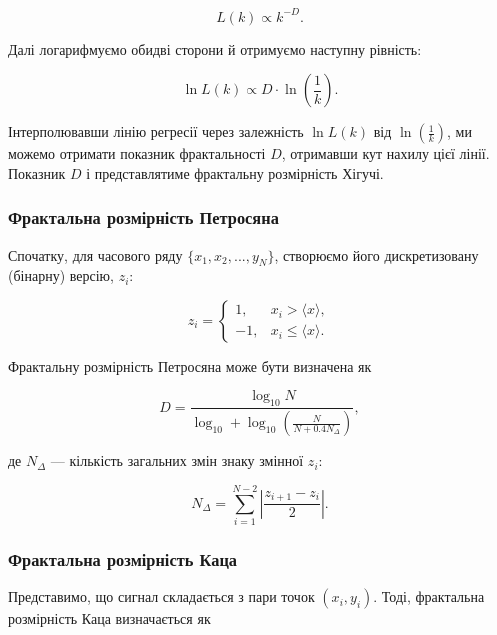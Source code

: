 \documentclass[
  letterpaper,
]{report}
\begin{document}
\[
L(k) \propto k^{-D}. 
\]

Далі логарифмуємо обидві сторони й отримуємо наступну рівність:

\[
\ln{L(k)} \propto D \cdot \ln{\left( \frac{1}{k} \right)}. 
\]

Інтерполювавши лінію регресії через залежність \(\ln{L(k)}\) від
\(\ln{\left( \frac{1}{k} \right)}\), ми можемо отримати показник
фрактальності \(D\), отримавши кут нахилу цієї лінії. Показник \(D\) і
представлятиме фрактальну розмірність Хігучі.

\hypertarget{ux444ux440ux430ux43aux442ux430ux43bux44cux43dux430-ux440ux43eux437ux43cux456ux440ux43dux456ux441ux442ux44c-ux43fux435ux442ux440ux43eux441ux44fux43dux430}{%
\subsubsection{Фрактальна розмірність
Петросяна}\label{ux444ux440ux430ux43aux442ux430ux43bux44cux43dux430-ux440ux43eux437ux43cux456ux440ux43dux456ux441ux442ux44c-ux43fux435ux442ux440ux43eux441ux44fux43dux430}}

Спочатку, для часового ряду \(\{ x_1, x_2,...,y_{N} \}\), створюємо його
дискретизовану (бінарну) версію, \(z_i\):

\[
z_i = 
\begin{cases}
    1, & x_i > \langle x \rangle, \\
    -1, & x_i \leq \langle x \rangle. 
\end{cases}
\]

Фрактальну розмірність Петросяна може бути визначена як

\[
D = \frac{\log_{10}{N}}{\log_{10} + \log_{10}{\left( \frac{N}{N+0.4N_{\Delta}} \right)}}, 
\]

де \(N_{\Delta}\) --- кількість загальних змін знаку змінної \(z_i\):

\[
N_{\Delta} = \sum_{i=1}^{N-2} \left|\frac{z_{i+1}-z_i}{2}\right|. 
\]

\hypertarget{ux444ux440ux430ux43aux442ux430ux43bux44cux43dux430-ux440ux43eux437ux43cux456ux440ux43dux456ux441ux442ux44c-ux43aux430ux446ux430}{%
\subsubsection{Фрактальна розмірність
Каца}\label{ux444ux440ux430ux43aux442ux430ux43bux44cux43dux430-ux440ux43eux437ux43cux456ux440ux43dux456ux441ux442ux44c-ux43aux430ux446ux430}}

Представимо, що сигнал складається з пари точок
\(\left( x_i, y_i \right)\). Тоді, фрактальна розмірність Каца
визначається як
\end{document}
